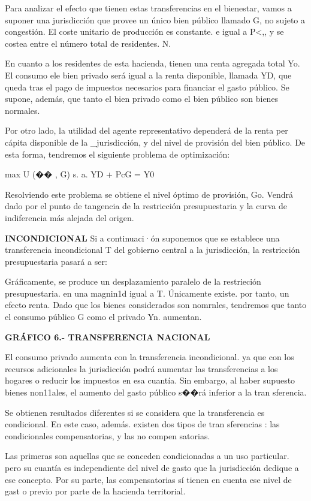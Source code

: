 \documentclass[10pt,a4paper]{article}
\begin{document}
Para analizar el efecto que tienen estas transferencias en el bienestar, vamos a suponer una jurisdicción que provee un único bien público llamado G, no sujeto a congestión. El coste unitario de producción es constante. e igual a P<,, y se costea entre el número total de residentes. N.

En cuanto a los residentes de esta hacienda, tienen una renta agregada total Yo. El consumo ele bien privado será igual a la renta disponible, llamada YD, que queda tras el pago de impuestos necesarios para financiar el gasto público. Se supone, además, que tanto el bien privado como el bien público son bienes normales.

Por otro lado, la utilidad del agente representativo dependerá de la renta per cápita disponible de la _jurisdicción, y del nivel de provisión del bien público. De esta forma, tendremos el siguiente problema de optimización:

max U (�� , G)
s. a. YD + PcG = Y0

Resolviendo este problema se obtiene el nivel óptimo de provisión, Go. Vendrá dado por el punto de tangencia de la restricción presupuestaria y la curva de indiferencia más alejada del origen.

\textbf{INCONDICIONAL}
Si a continuaci·ón suponemos que se establece una transferencia incondicional T del gobierno central a la jurisdicción, la restricción presupuestaria pasará a ser:

Gráficamente, se produce un desplazamiento paralelo de la restrieción presupuestaria. en una magnin1d igual a T. Únicamente existe. por tanto, un efecto renta. Dado que los bienes considerados son nomrnles, tendremos que tanto el consumo público G como el privado Yn. aumentan.

\textbf{GRÁFICO 6.- TRANSFERENCIA NACIONAL}

El consumo privado aumenta con la transferencia incondicional. ya que con los recursos adicionales la jurisdicción podrá aumentar las transferencias a los hogares o reducir los impuestos en esa cuantía. Sin embargo, al haber supuesto bienes non11ales, el aumento del gasto público s��rá inferior a la tran sferencia.

Se obtienen resultados diferentes si se considera que la transferencia es condicional. En este caso, además. existen dos tipos de tran sferencias : las condicionales compensatorias, y las no compen satorias.

Las primeras son aquellas que se conceden condicionadas a un uso particular. pero su cuantía es independiente del nivel de gasto que la jurisdicción dedique a ese concepto. Por su parte, las compensatorias sí tienen en cuenta ese nivel de gast o previo por parte de la hacienda territorial.
\end{document}
